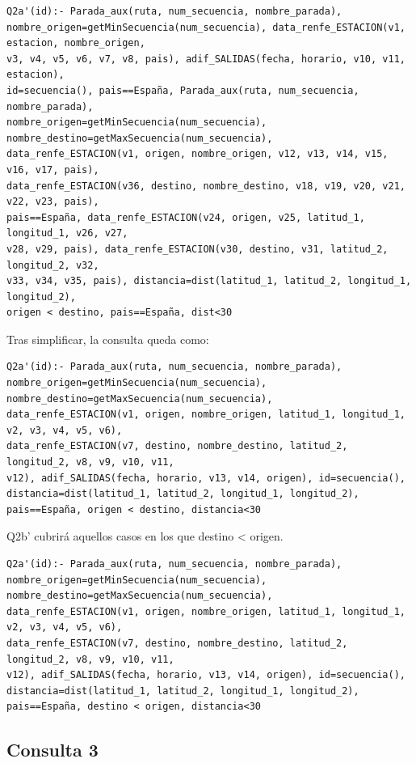 \begin{verbatim}
Q2a'(id):- Parada_aux(ruta, num_secuencia, nombre_parada), 
nombre_origen=getMinSecuencia(num_secuencia), data_renfe_ESTACION(v1, estacion, nombre_origen, 
v3, v4, v5, v6, v7, v8, pais), adif_SALIDAS(fecha, horario, v10, v11, estacion), 
id=secuencia(), pais==España, Parada_aux(ruta, num_secuencia, nombre_parada), 
nombre_origen=getMinSecuencia(num_secuencia), nombre_destino=getMaxSecuencia(num_secuencia), 
data_renfe_ESTACION(v1, origen, nombre_origen, v12, v13, v14, v15, v16, v17, pais), 
data_renfe_ESTACION(v36, destino, nombre_destino, v18, v19, v20, v21, v22, v23, pais), 
pais==España, data_renfe_ESTACION(v24, origen, v25, latitud_1, longitud_1, v26, v27, 
v28, v29, pais), data_renfe_ESTACION(v30, destino, v31, latitud_2, longitud_2, v32, 
v33, v34, v35, pais), distancia=dist(latitud_1, latitud_2, longitud_1, longitud_2), 
origen < destino, pais==España, dist<30
\end{verbatim}

Tras simplificar, la consulta queda como:

\begin{verbatim}
Q2a'(id):- Parada_aux(ruta, num_secuencia, nombre_parada), 
nombre_origen=getMinSecuencia(num_secuencia), nombre_destino=getMaxSecuencia(num_secuencia), 
data_renfe_ESTACION(v1, origen, nombre_origen, latitud_1, longitud_1, v2, v3, v4, v5, v6), 
data_renfe_ESTACION(v7, destino, nombre_destino, latitud_2, longitud_2, v8, v9, v10, v11, 
v12), adif_SALIDAS(fecha, horario, v13, v14, origen), id=secuencia(), 
distancia=dist(latitud_1, latitud_2, longitud_1, longitud_2), 
pais==España, origen < destino, distancia<30
\end{verbatim}

Q2b' cubrirá aquellos casos en los que destino \textless{} origen.

\begin{verbatim}
Q2a'(id):- Parada_aux(ruta, num_secuencia, nombre_parada), 
nombre_origen=getMinSecuencia(num_secuencia), nombre_destino=getMaxSecuencia(num_secuencia), 
data_renfe_ESTACION(v1, origen, nombre_origen, latitud_1, longitud_1, v2, v3, v4, v5, v6), 
data_renfe_ESTACION(v7, destino, nombre_destino, latitud_2, longitud_2, v8, v9, v10, v11, 
v12), adif_SALIDAS(fecha, horario, v13, v14, origen), id=secuencia(), 
distancia=dist(latitud_1, latitud_2, longitud_1, longitud_2), 
pais==España, destino < origen, distancia<30
\end{verbatim}

\subsection{Consulta 3}\label{consulta-3}

